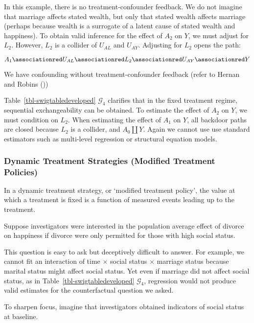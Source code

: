 \documentclass[
  single column]{article}
\begin{document}
In this example, there is no treatment-confounder feedback. We do not
imagine that marriage affects stated wealth, but only that stated wealth
affects marriage (perhaps because wealth is a surrogate of a latent
cause of stated wealth and happiness). To obtain valid inference for the
effect of \(A_2\) on \(Y\), we must adjust for \(L_2\). However, \(L_2\)
is a collider of \(U_{AL}\) and \(U_{AY}\). Adjusting for \(L_2\) opens
the path:

\[
A_1 \associationred U_{AL} \associationred L_2 \associationred U_{AY} \associationred Y
\]

We have confounding without treatment-confounder feedback (refer to
Hernan and Robins ())

Table~\ref{tbl-swigtabledeveloped} \(\mathcal{G}_4\) clarifies that in
the fixed treatment regime, sequential exchangeability can be obtained.
To estimate the effect of \(A_2\) on \(Y\), we must condition on
\(L_2\). When estimating the effect of \(A_1\) on \(Y\), all backdoor
paths are closed because \(L_2\) is a collider, and \(A_0 \coprod Y\).
Again we cannot use use standard estimators such as multi-level
regression or structural equation models.

\subsubsection{Dynamic Treatment Strategies (Modified Treatment
Policies)}\label{dynamic-treatment-strategies-modified-treatment-policies}

In a dynamic treatment strategy, or `modified treatment policy', the
value at which a treatment is fixed is a function of measured events
leading up to the treatment.

Suppose investigators were interested in the population average effect
of divorce on happiness if divorce were only permitted for those with
high social status.

This question is easy to ask but deceptively difficult to answer. For
example, we cannot fit an interaction of time \(\times\) social status
\(\times\) marriage status because marital status might affect social
status. Yet even if marriage did not affect social status, as in
Table~\ref{tbl-swigtabledeveloped} \(\mathcal{G}_4\), regression would
not produce valid estimates for the counterfactual question we asked.

To sharpen focus, imagine that investigators obtained indicators of
social status at baseline.
\end{document}
